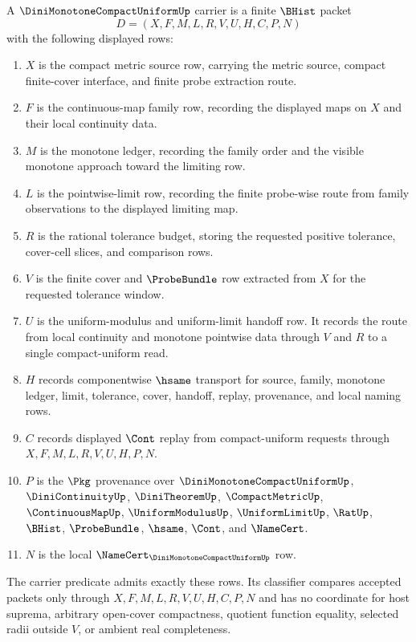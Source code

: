 \begin{definition}
\label{def:dini-monotone-compact-uniform-carrier}
A $\DiniMonotoneCompactUniformUp$ carrier is a finite $\BHist$ packet
$$
D=(X,F,M,L,R,V,U,H,C,P,N)
$$
with the following displayed rows:
\begin{enumerate}
\item $X$ is the compact metric source row, carrying the metric source, compact finite-cover interface, and finite probe extraction route.
\item $F$ is the continuous-map family row, recording the displayed maps on $X$ and their local continuity data.
\item $M$ is the monotone ledger, recording the family order and the visible monotone approach toward the limiting row.
\item $L$ is the pointwise-limit row, recording the finite probe-wise route from family observations to the displayed limiting map.
\item $R$ is the rational tolerance budget, storing the requested positive tolerance, cover-cell slices, and comparison rows.
\item $V$ is the finite cover and $\ProbeBundle$ row extracted from $X$ for the requested tolerance window.
\item $U$ is the uniform-modulus and uniform-limit handoff row. It records the route from local continuity and monotone pointwise data through $V$ and $R$ to a single compact-uniform read.
\item $H$ records componentwise $\hsame$ transport for source, family, monotone ledger, limit, tolerance, cover, handoff, replay, provenance, and local naming rows.
\item $C$ records displayed $\Cont$ replay from compact-uniform requests through $X,F,M,L,R,V,U,H,P,N$.
\item $P$ is the $\Pkg$ provenance over $\DiniMonotoneCompactUniformUp$, $\DiniContinuityUp$, $\DiniTheoremUp$, $\CompactMetricUp$, $\ContinuousMapUp$, $\UniformModulusUp$, $\UniformLimitUp$, $\RatUp$, $\BHist$, $\ProbeBundle$, $\hsame$, $\Cont$, and $\NameCert$.
\item $N$ is the local $\NameCert_{\DiniMonotoneCompactUniformUp}$ row.
\end{enumerate}
The carrier predicate admits exactly these rows. Its classifier compares accepted packets only through $X,F,M,L,R,V,U,H,C,P,N$ and has no coordinate for host suprema, arbitrary open-cover compactness, quotient function equality, selected radii outside $V$, or ambient real completeness.
\end{definition}

